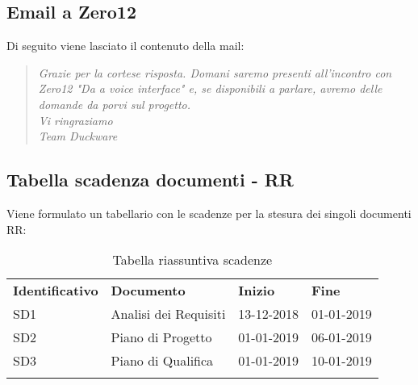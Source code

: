	\subsection{Email a Zero12}
	\label{sec:mail}
	Di seguito viene lasciato il contenuto della mail:
	\begin{quote}
		\textit{
	 	Grazie per la cortese risposta.
	 	Domani saremo presenti all'incontro con Zero12 "Da  a voice interface" e, se disponibili a parlare, avremo delle domande da porvi sul progetto.\\[0.5cm]
	 	Vi ringraziamo \\
	 	Team Duckware
	 	}
	\end{quote}
	\clearpage
	\subsection{Tabella scadenza documenti - RR}
	\label{sec:scadenze}
	Viene formulato un tabellario con le scadenze per la stesura dei singoli documenti RR:
	\begin{center}
		\renewcommand{\arraystretch}{1.5}
		\begin{longtable}{  p{3cm} p{5cm} p{2cm} p{2cm} }
			\rowcolor{tableHeadYellow}
			\textbf{Identificativo}&\textbf{Documento}&\textbf{Inizio}&\textbf{Fine}\\
			SD1 & Analisi dei Requisiti & 13-12-2018 & 01-01-2019\\
			SD2 & Piano di Progetto & 01-01-2019 & 06-01-2019\\
			SD3 & Piano di Qualifica & 01-01-2019 & 10-01-2019\\
			\rowcolor{white}
			\caption{Tabella riassuntiva scadenze}
			\label{sec:tabella_riassuntiva3}
		\end{longtable}	
	\end{center}